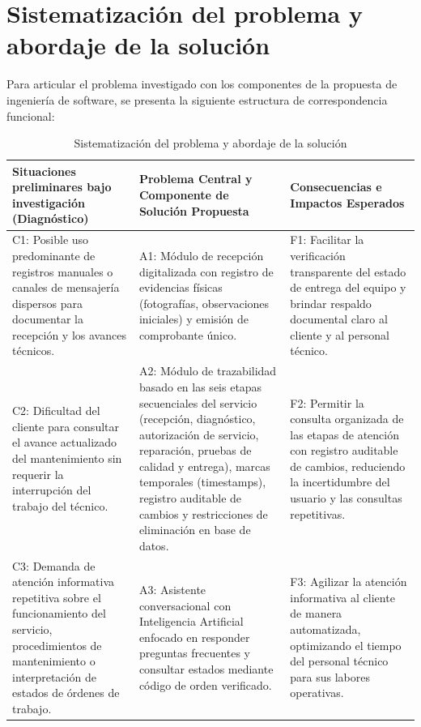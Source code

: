 \section{Sistematización del problema y abordaje de la solución}

Para articular el problema investigado con los componentes de la propuesta de ingeniería de software, se presenta la siguiente estructura de correspondencia funcional:

\begin{table}[H]
\centering
\caption{Sistematización del problema y abordaje de la solución}
\label{tab:sistematizacion}
\small
\begin{tabular}{p{4.5cm} p{5cm} p{5cm}}
\toprule
\textbf{Situaciones preliminares bajo investigación (Diagnóstico)} & \textbf{Problema Central y Componente de Solución Propuesta} & \textbf{Consecuencias e Impactos Esperados} \\
\midrule
C1: Posible uso predominante de registros manuales o canales de mensajería dispersos para documentar la recepción y los avances técnicos. & A1: Módulo de recepción digitalizada con registro de evidencias físicas (fotografías, observaciones iniciales) y emisión de comprobante único. & F1: Facilitar la verificación transparente del estado de entrega del equipo y brindar respaldo documental claro al cliente y al personal técnico. \\
\addlinespace
C2: Dificultad del cliente para consultar el avance actualizado del mantenimiento sin requerir la interrupción del trabajo del técnico. & A2: Módulo de trazabilidad basado en las seis etapas secuenciales del servicio (recepción, diagnóstico, autorización de servicio, reparación, pruebas de calidad y entrega), marcas temporales (timestamps), registro auditable de cambios y restricciones de eliminación en base de datos. & F2: Permitir la consulta organizada de las etapas de atención con registro auditable de cambios, reduciendo la incertidumbre del usuario y las consultas repetitivas. \\
\addlinespace
C3: Demanda de atención informativa repetitiva sobre el funcionamiento del servicio, procedimientos de mantenimiento o interpretación de estados de órdenes de trabajo. & A3: Asistente conversacional con Inteligencia Artificial enfocado en responder preguntas frecuentes y consultar estados mediante código de orden verificado. & F3: Agilizar la atención informativa al cliente de manera automatizada, optimizando el tiempo del personal técnico para sus labores operativas. \\
\bottomrule
\end{tabular}
\end{table}